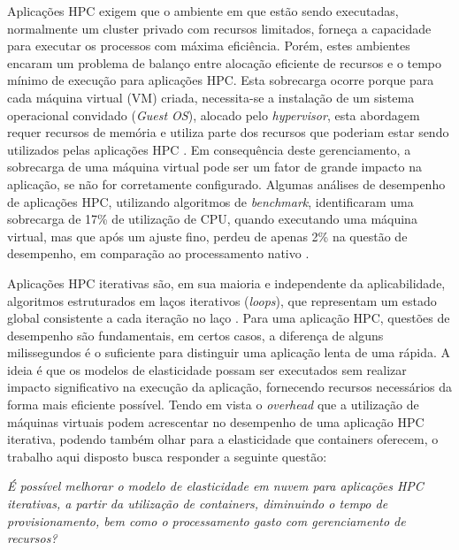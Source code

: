 \documentclass[twoside,english,brazilian]{UNISINOSartigo}
\begin{document}
Aplicações HPC exigem que o ambiente em que estão sendo executadas, normalmente um cluster privado com recursos limitados, forneça a capacidade para executar os processos com máxima eficiência. Porém, estes ambientes encaram um problema de balanço entre alocação eficiente de recursos e o tempo mínimo de execução para aplicações HPC. Esta sobrecarga ocorre porque para cada máquina virtual (VM) criada, necessita-se a instalação de um sistema operacional convidado (\textit{Guest OS}), alocado pelo \textit{hypervisor}, esta abordagem requer recursos de memória e utiliza parte dos recursos que poderiam estar sendo utilizados pelas aplicações HPC \cite{Adufu2015}. Em consequência deste gerenciamento, a sobrecarga de uma máquina virtual pode ser um fator de grande impacto na aplicação, se não for corretamente configurado. Algumas análises de desempenho de aplicações HPC, utilizando algoritmos de \textit{benchmark}, identificaram uma sobrecarga de 17\% de utilização de CPU, quando executando uma máquina virtual, mas que após um ajuste fino, perdeu de apenas 2\% na questão de desempenho, em comparação ao processamento nativo \cite{Stenberg2016}.

Aplicações HPC iterativas são, em sua maioria e independente da aplicabilidade, algoritmos estruturados em laços iterativos (\textit{loops}), que representam um estado global consistente a cada iteração no laço \cite{Facco2016}. Para uma aplicação HPC, questões de desempenho são fundamentais, em certos casos, a diferença de alguns milissegundos é o suficiente para distinguir uma aplicação lenta de uma rápida. A ideia é que os modelos de elasticidade possam ser executados sem realizar impacto significativo na execução da aplicação, fornecendo recursos necessários da forma mais eficiente possível. Tendo em vista o \textit{overhead} que a utilização de máquinas virtuais podem acrescentar no desempenho de uma aplicação HPC iterativa, podendo também olhar para a elasticidade que containers oferecem, o trabalho aqui disposto busca responder a seguinte questão:

	\textit{É possível melhorar o modelo de elasticidade em nuvem para aplicações HPC iterativas, a partir da utilização de containers, diminuindo o tempo de provisionamento, bem como o processamento gasto com gerenciamento de recursos?} 
\end{document}
